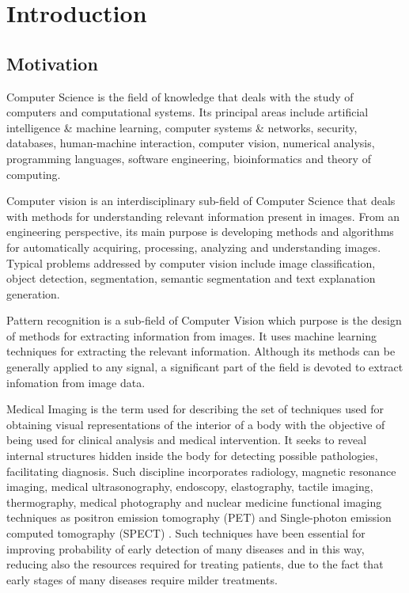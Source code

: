 
\chapter{Introduction} %

\label{Chapter:Introduction} %


\section{Motivation}

Computer Science is the field of knowledge that deals with the study of computers and computational systems. Its principal areas include artificial intelligence \& machine learning, computer systems \& networks, security, databases, human-machine interaction, computer vision, numerical analysis, programming languages, software engineering, bioinformatics and theory of computing. 

Computer vision is an interdisciplinary sub-field of Computer Science that deals with methods for understanding relevant information present in images. From an engineering perspective, its main purpose is developing methods and algorithms for automatically acquiring, processing, analyzing and understanding images. Typical problems addressed by computer vision include image classification, object detection, segmentation, semantic segmentation and text explanation generation.

Pattern recognition is a sub-field of Computer Vision which purpose is the design of methods for extracting information from images. It uses machine learning techniques for extracting the relevant information. Although its methods can be generally applied to any signal, a significant part of the field is devoted to extract infomation from image data.

Medical Imaging is the term used for describing the set of techniques used for obtaining visual representations of the interior of a body with the objective of being used for clinical analysis and medical intervention. It seeks to reveal internal structures hidden inside the body for detecting possible pathologies, facilitating diagnosis. Such discipline incorporates radiology, magnetic resonance imaging, medical ultrasonography, endoscopy, elastography, tactile imaging, thermography, medical photography and nuclear medicine functional imaging techniques as positron emission tomography (PET) and Single-photon emission computed tomography (SPECT) \citep{bushberg2011essential}. Such techniques have been essential for improving probability of early detection of many diseases and in this way, reducing also the resources required for treating patients, due to the fact that early stages of many diseases require milder treatments.

